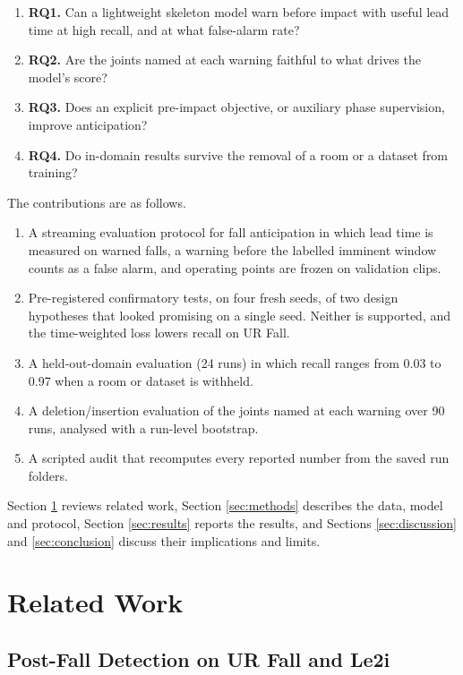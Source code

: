 \documentclass[journal]{IEEEtran}
\begin{document}
\begin{enumerate}
\item \textbf{RQ1.} Can a lightweight skeleton model warn before impact with useful lead time at high recall, and at what false-alarm rate?
\item \textbf{RQ2.} Are the joints named at each warning faithful to what drives the model's score?
\item \textbf{RQ3.} Does an explicit pre-impact objective, or auxiliary phase supervision, improve anticipation?
\item \textbf{RQ4.} Do in-domain results survive the removal of a room or a dataset from training?
\end{enumerate}


The contributions are as follows.

\begin{enumerate}
\item A streaming evaluation protocol for fall anticipation in which lead time is measured on warned falls, a warning before the labelled imminent window counts as a false alarm, and operating points are frozen on validation clips.
\item Pre-registered confirmatory tests, on four fresh seeds, of two design hypotheses that looked promising on a single seed. Neither is supported, and the time-weighted loss lowers recall on UR Fall.
\item A held-out-domain evaluation (24 runs) in which recall ranges from 0.03 to 0.97 when a room or dataset is withheld.
\item A deletion/insertion evaluation of the joints named at each warning over 90 runs, analysed with a run-level bootstrap.
\item A scripted audit that recomputes every reported number from the saved run folders.
\end{enumerate}


Section \ref{sec:related} reviews related work, Section \ref{sec:methods} describes the data, model and protocol, Section \ref{sec:results} reports the results, and Sections \ref{sec:discussion} and \ref{sec:conclusion} discuss their implications and limits.


\section{Related Work}\label{sec:related}

\subsection{Post-Fall Detection on UR Fall and Le2i}\label{sub:post}
\end{document}
